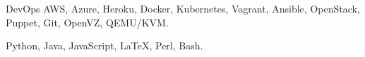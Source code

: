 

\begin{cvskills}

  \cvskill
    {DevOps} %
    {AWS, Azure, Heroku, Docker, Kubernetes, Vagrant, Ansible, OpenStack, Puppet, Git, OpenVZ, QEMU/KVM.} %

  \cvskill
    {
     } %
    {Python, Java, JavaScript, LaTeX, Perl, Bash.} %

  \cvskill
    {} %
    {} %
\end{cvskills}

